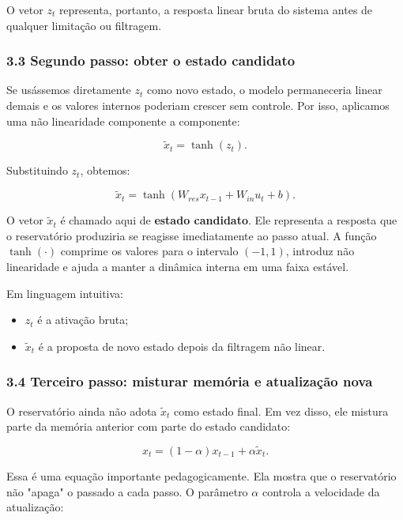 \documentclass[12pt]{article}
\providecommand{\tightlist}{%
          \setlength{\itemsep}{0pt}\setlength{\parskip}{0pt}}
\begin{document}
O vetor \(z_t\) representa, portanto, a resposta linear bruta do sistema antes de qualquer limitação ou filtragem.

\subsubsection{3.3 Segundo passo: obter o estado candidato}\label{33-segundo-passo-obter-o-estado-candidato}

Se usássemos diretamente \(z_t\) como novo estado, o modelo permaneceria linear demais e os valores internos poderiam crescer sem controle. Por isso, aplicamos uma não linearidade componente a componente:

\[
\widetilde{x}_t = \tanh(z_t).
\]

Substituindo \(z_t\), obtemos:

\[
\widetilde{x}_t = \tanh(W_{res} x_{t-1} + W_{in} u_t + b).
\]

O vetor \(\widetilde{x}_t\) é chamado aqui de \textbf{estado candidato}. Ele representa a resposta que o reservatório produziria se reagisse imediatamente ao passo atual. A função \(\tanh(\cdot)\) comprime os valores para o intervalo \((-1,1)\), introduz não linearidade e ajuda a manter a dinâmica interna em uma faixa estável.

Em linguagem intuitiva:

\begin{itemize}
\tightlist
\item
  \(z_t\) é a ativação bruta;
\item
  \(\widetilde{x}_t\) é a proposta de novo estado depois da filtragem não linear.
\end{itemize}

\subsubsection{3.4 Terceiro passo: misturar memória e atualização nova}\label{34-terceiro-passo-misturar-memuxf3ria-e-atualizauxe7uxe3o-nova}

O reservatório ainda não adota \(\widetilde{x}_t\) como estado final. Em vez disso, ele mistura parte da memória anterior com parte do estado candidato:

\[
x_t = (1 - \alpha) x_{t-1} + \alpha \widetilde{x}_t.
\]

Essa é uma equação importante pedagogicamente. Ela mostra que o reservatório não "apaga" o passado a cada passo. O parâmetro \(\alpha\) controla a velocidade da atualização:
\end{document}
